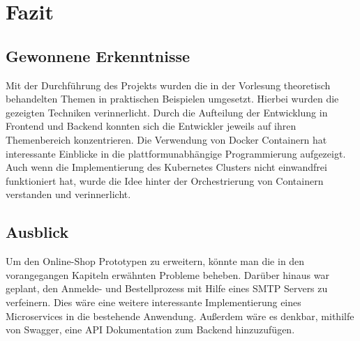 \chapter{Fazit}\label{ch:fazit}
\section{Gewonnene Erkenntnisse}\label{sec:gewonnene-erkenntnisse}
Mit der Durchführung des Projekts wurden die in der Vorlesung theoretisch behandelten Themen in praktischen Beispielen umgesetzt. Hierbei wurden die gezeigten Techniken verinnerlicht. Durch die Aufteilung der Entwicklung in Frontend und Backend konnten sich die Entwickler jeweils auf ihren Themenbereich konzentrieren. Die Verwendung von Docker Containern hat interessante Einblicke in die plattformunabhängige Programmierung aufgezeigt. Auch wenn die Implementierung des Kubernetes Clusters nicht einwandfrei funktioniert hat, wurde die Idee hinter der Orchestrierung von Containern verstanden und verinnerlicht. 

\section{Ausblick}\label{sec:ausblick}
Um den Online-Shop Prototypen zu erweitern, könnte man die in den vorangegangen Kapiteln erwähnten Probleme beheben. Darüber hinaus war geplant, den Anmelde- und Bestellprozess mit Hilfe eines SMTP Servers zu verfeinern. Dies wäre eine weitere interessante Implementierung eines Microservices in die bestehende Anwendung. Außerdem wäre es denkbar, mithilfe von Swagger, eine API Dokumentation zum Backend hinzuzufügen.